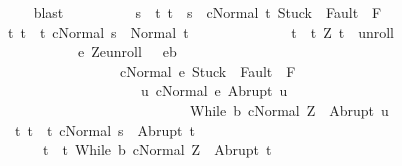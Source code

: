 \begin{isabellebody}
\ \ \ \ \ \ \ \ \ \ \isamarkupfalse%
\ blast\isanewline
\ \ \ \ \ \ \ \ \isamarkupfalse%
\ {\isachardoublequoteopen}s\ {\isasymin}\ {\isacharbraceleft}t{\isachardot}\ t\ {\isacharequal}\ s\ {\isasymand}\ {\isasymGamma}{\isasymturnstile}{\isasymlangle}c{\isacharcomma}Normal\ t{\isasymrangle}\ {\isasymRightarrow}{\isasymnotin}{\isacharparenleft}{\isacharbraceleft}Stuck{\isacharbraceright}\ {\isasymunion}\ Fault\ {\isacharbackquote}\ {\isacharparenleft}{\isacharminus}F{\isacharparenright}{\isacharparenright}{\isacharbraceright}\ {\isasymand}\isanewline
\ \ \ \ \ \ \ \ {\isacharparenleft}{\isasymforall}t{\isachardot}\ t\ {\isasymin}\ {\isacharbraceleft}t{\isachardot}\ {\isasymGamma}{\isasymturnstile}{\isasymlangle}c{\isacharcomma}Normal\ s{\isasymrangle}\ {\isasymRightarrow}\ Normal\ t{\isacharbraceright}\ {\isasymlongrightarrow}\isanewline
\ \ \ \ \ \ \ \ \ \ \ \ \ t\ {\isasymin}\ {\isacharbraceleft}t{\isachardot}\ {\isacharparenleft}Z{\isacharcomma}\ t{\isacharparenright}\ {\isasymin}\ {\isacharquery}unroll\ {\isasymand}\ \isanewline
\ \ \ \ \ \ \ \ \ \ \ \ \ \ \ \ \ \ {\isacharparenleft}{\isasymforall}e{\isachardot}\ {\isacharparenleft}Z{\isacharcomma}e{\isacharparenright}{\isasymin}{\isacharquery}unroll\ {\isasymlongrightarrow}\ \ e{\isasymin}b\ \isanewline
\ \ \ \ \ \ \ \ \ \ \ \ \ \ \ \ \ \ \ \ \ \ \ {\isasymlongrightarrow}\ {\isasymGamma}{\isasymturnstile}{\isasymlangle}c{\isacharcomma}Normal\ e{\isasymrangle}\ {\isasymRightarrow}{\isasymnotin}{\isacharparenleft}{\isacharbraceleft}Stuck{\isacharbraceright}\ {\isasymunion}\ Fault\ {\isacharbackquote}\ {\isacharparenleft}{\isacharminus}F{\isacharparenright}{\isacharparenright}\ {\isasymand}\ \isanewline
\ \ \ \ \ \ \ \ \ \ \ \ \ \ \ \ \ \ \ \ \ \ \ \ \ \ \ {\isacharparenleft}{\isasymforall}u{\isachardot}\ {\isasymGamma}{\isasymturnstile}{\isasymlangle}c{\isacharcomma}Normal\ e{\isasymrangle}\ {\isasymRightarrow}Abrupt\ u\ {\isasymlongrightarrow}\ \isanewline
\ \ \ \ \ \ \ \ \ \ \ \ \ \ \ \ \ \ \ \ \ \ \ \ \ \ \ \ \ \ \ \ \ \ {\isasymGamma}{\isasymturnstile}{\isasymlangle}While\ b\ c{\isacharcomma}Normal\ Z{\isasymrangle}\ {\isasymRightarrow}\ Abrupt\ u{\isacharparenright}{\isacharparenright}{\isacharbraceright}{\isacharparenright}\ {\isasymand}\ \isanewline
\ \ \ \ \ \ \ \ \ {\isacharparenleft}{\isasymforall}t{\isachardot}\ t\ {\isasymin}\ {\isacharbraceleft}t{\isachardot}\ {\isasymGamma}{\isasymturnstile}{\isasymlangle}c{\isacharcomma}Normal\ s{\isasymrangle}\ {\isasymRightarrow}\ Abrupt\ t{\isacharbraceright}\ {\isasymlongrightarrow}\isanewline
\ \ \ \ \ \ \ \ \ \ \ \ \ t\ {\isasymin}\ {\isacharbraceleft}t{\isachardot}\ {\isasymGamma}{\isasymturnstile}{\isasymlangle}While\ b\ c{\isacharcomma}Normal\ Z{\isasymrangle}\ {\isasymRightarrow}\ Abrupt\ t{\isacharbraceright}{\isacharparenright}{\isachardoublequoteclose}\isanewline

\end{isabellebody}
